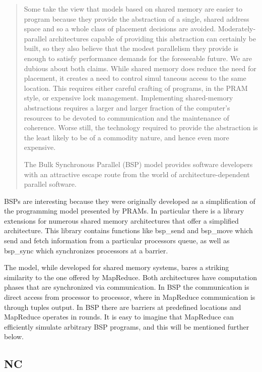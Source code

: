 \documentclass{article}
\begin{document}
\begin{quotation}
Some take the view that models based on shared memory are easier to program because
they provide the abstraction of a single, shared address space and so a whole class of placement
decisions are avoided. Moderately-parallel architectures capable of providing this abstraction
can certainly be built, so they also believe that the modest parallelism they provide is enough
to satisfy performance demands for the foreseeable future. We are dubious about both claims.
While shared memory does reduce the need for placement, it creates a need to control simul taneous access to the same location. This requires either careful crafting of programs, in
the PRAM style, or expensive lock management. Implementing shared-memory abstractions
requires a larger and larger fraction of the computer's resources to be devoted to communication and the maintenance of coherence. Worse still, the technology required to provide the
abstraction is the least likely to be of a commodity nature, and hence even more expensive.

The Bulk Synchronous Parallel (BSP) model provides software developers with an
attractive escape route from the world of architecture-dependent parallel software. \cite{bsp}

\end{quotation}


BSPs are interesting because they were originally developed as a simplification of the programming model presented by PRAMs. In particular there is a library extensions for numerous shared memory architectures that offer a simplified architecture. This library contains functions like bsp\_send and bsp\_move which send and fetch information from a particular processors queue, as well as bsp\_sync which synchronizes processors at a barrier. 

The model, while developed for shared memory systems, bares a striking similarity to the one offered by MapReduce. Both architectures have computation phases that are synchronized via communication. In BSP the communication is direct access from processor to processor, where in MapReduce communication is through tuples output. In BSP there are barriers at predefined locations and MapReduce operates in rounds. It is easy to imagine that MapReduce can efficiently simulate arbitrary BSP programs, and this will be mentioned further below.   

\subsection{NC}
\end{document}
